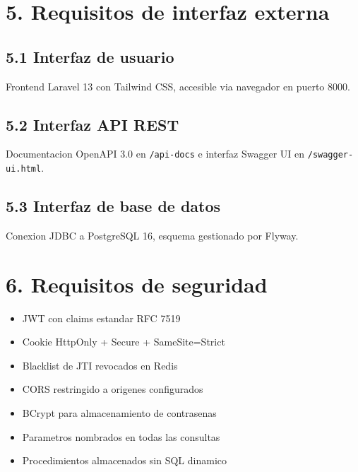 \documentclass[
11pt,
a4paper,
]{report}
\newcommand{\passthrough}[1]{#1}
\providecommand{\tightlist}{%
	\setlength{\itemsep}{0pt}\setlength{\parskip}{0pt}}
\begin{document}
	\hypertarget{requisitos-de-interfaz-externa}{%
		\section{5. Requisitos de interfaz externa}\label{requisitos-de-interfaz-externa}}
	
	\hypertarget{interfaz-de-usuario}{%
		\subsection{5.1 Interfaz de usuario}\label{interfaz-de-usuario}}
	
	Frontend Laravel 13 con Tailwind CSS, accesible via navegador en puerto 8000.
	
	\hypertarget{interfaz-api-rest}{%
		\subsection{5.2 Interfaz API REST}\label{interfaz-api-rest}}
	
	Documentacion OpenAPI 3.0 en \passthrough{\lstinline!/api-docs!} e interfaz Swagger UI en \passthrough{\lstinline!/swagger-ui.html!}.
	
	\hypertarget{interfaz-de-base-de-datos}{%
		\subsection{5.3 Interfaz de base de datos}\label{interfaz-de-base-de-datos}}
	
	Conexion JDBC a PostgreSQL 16, esquema gestionado por Flyway.
	
	\hypertarget{requisitos-de-seguridad}{%
		\section{6. Requisitos de seguridad}\label{requisitos-de-seguridad}}
	
	\begin{itemize}
		\tightlist
		\item
		JWT con claims estandar RFC 7519
		\item
		Cookie HttpOnly + Secure + SameSite=Strict
		\item
		Blacklist de JTI revocados en Redis
		\item
		CORS restringido a origenes configurados
		\item
		BCrypt para almacenamiento de contrasenas
		\item
		Parametros nombrados en todas las consultas
		\item
		Procedimientos almacenados sin SQL dinamico
	\end{itemize}
	
\end{document}
